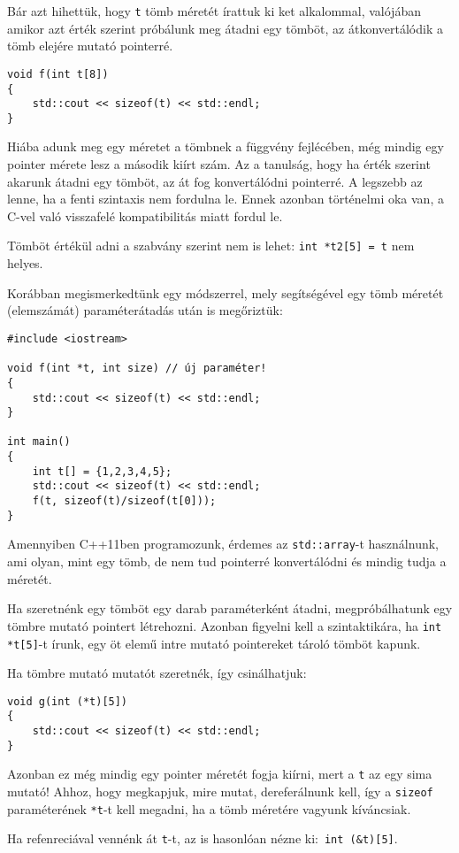 \documentclass[a4paper,11.5pt,table]{article}
\begin{document}
	Bár azt hihettük, hogy \texttt{t} tömb méretét írattuk ki ket alkalommal, valójában amikor azt érték szerint próbálunk meg átadni egy tömböt, az átkonvertálódik a tömb elejére mutató pointerré.
	\begin{lstlisting}
void f(int t[8])
{
	std::cout << sizeof(t) << std::endl;
}
	\end{lstlisting}
	Hiába adunk meg egy méretet a tömbnek a függvény fejlécében, még mindig egy pointer mérete lesz a második kiírt szám. Az a tanulság, hogy ha érték szerint akarunk átadni egy tömböt, az át fog konvertálódni pointerré. A legszebb az lenne, ha a fenti szintaxis nem fordulna le. Ennek azonban történelmi oka van, a C-vel való visszafelé kompatibilitás miatt fordul le. 
	\begin{note}
		Tömböt értékül adni a szabvány szerint nem is lehet: \texttt{int *t2[5] = t} nem helyes.
	\end{note}
	Korábban megismerkedtünk egy módszerrel, mely segítségével egy tömb méretét (elemszámát) paraméterátadás után is megőriztük:
	\begin{lstlisting}
#include <iostream>

void f(int *t, int size) // új paraméter!
{
	std::cout << sizeof(t) << std::endl;
}

int main()
{
	int t[] = {1,2,3,4,5};
	std::cout << sizeof(t) << std::endl;
	f(t, sizeof(t)/sizeof(t[0]));
}
	\end{lstlisting}
	\begin{note}
		Amennyiben C++11ben programozunk, érdemes az \texttt{std::array}-t használnunk, ami olyan, mint egy tömb, de nem tud pointerré konvertálódni és mindig tudja a méretét.
	\end{note}
	Ha szeretnénk egy tömböt egy darab paraméterként átadni, megpróbálhatunk egy tömbre mutató pointert létrehozni. Azonban figyelni kell a szintaktikára, ha \texttt{int *t[5]}-t írunk, egy öt elemű intre mutató pointereket tároló tömböt kapunk.
	
	\medskip
	Ha tömbre mutató mutatót szeretnék, így csinálhatjuk:
	\begin{lstlisting}
void g(int (*t)[5])
{
	std::cout << sizeof(t) << std::endl;
}
	\end{lstlisting}
	Azonban ez még mindig egy pointer méretét fogja kiírni, mert a \texttt{t} az egy sima mutató! Ahhoz, hogy megkapjuk, mire mutat, dereferálnunk kell, így a \texttt{sizeof} paraméterének \texttt{*t}-t kell megadni, ha a tömb méretére vagyunk kíváncsiak.
	\begin{note}
		Ha refenreciával vennénk át \texttt{t}-t, az is hasonlóan nézne ki:\, \texttt{int (\&t)[5]}.
	\end{note}
	\medskip
	
\end{document}

